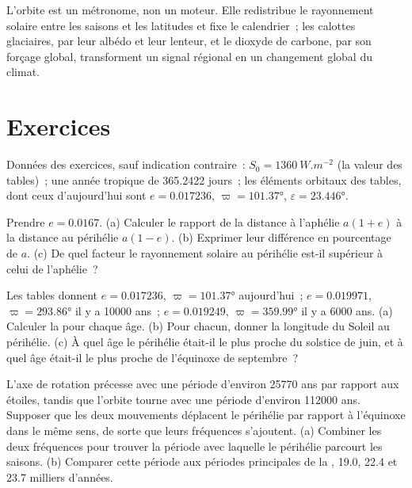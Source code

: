 L'orbite est un métronome, non un moteur. Elle redistribue le rayonnement solaire entre les saisons et les latitudes
et fixe le calendrier~; les calottes glaciaires, par leur albédo et leur lenteur, et le dioxyde de carbone, par son forçage
global, transforment un signal régional en un changement global du climat.

\section*{Exercices}\label{sec:b2:orbital-forcing:exercises}

Données des exercices, sauf indication contraire~: $S_0 = \qty{1360}{W.m^{-2}}$ (la valeur des
tables)~; une année tropique de \num{365.2422} jours~; les éléments orbitaux des tables, dont ceux d'aujourd'hui
sont $e = 0.017236$, $\varpi = \ang{101.37}$, $\varepsilon = \ang{23.446}$.

\begin{exercise}[$\star$]\label{exo:b2:orbital-forcing:1}
Prendre $e = 0.0167$. (a) Calculer le rapport de la distance à l'aphélie $a(1 + e)$ à la distance au périhélie
$a(1 - e)$. (b) Exprimer leur différence en pourcentage de $a$. (c) De quel facteur le rayonnement solaire au périhélie
est-il supérieur à celui de l'aphélie~?
\end{exercise}

\begin{exercise}[$\star$]\label{exo:b2:orbital-forcing:2}
Les tables donnent $e = 0.017236$, $\varpi = \ang{101.37}$ aujourd'hui~; $e = 0.019971$, $\varpi =
\ang{293.86}$ il y a \num{10000} ans~; $e = 0.019249$, $\varpi = \ang{359.99}$ il y a \num{6000} ans.
(a) Calculer la  pour chaque âge. (b) Pour chacun, donner la longitude du Soleil
au périhélie. (c) À quel âge le périhélie était-il le plus proche du solstice de juin, et à quel âge
était-il le plus proche de l'équinoxe de septembre~?
\end{exercise}

\begin{exercise}[$\star$]\label{exo:b2:orbital-forcing:3}
L'axe de rotation précesse avec une période d'environ \num{25770} ans par rapport aux étoiles, tandis que
l'orbite tourne avec une période d'environ \num{112000} ans. Supposer que les deux mouvements déplacent
le périhélie par rapport à l'équinoxe dans le même sens, de sorte que leurs fréquences s'ajoutent. (a) Combiner
les deux fréquences pour trouver la période avec laquelle le périhélie parcourt les saisons. (b) Comparer cette période aux
périodes principales de la ,
\num{19.0}, \num{22.4} et \num{23.7} milliers d'années.
\end{exercise}

